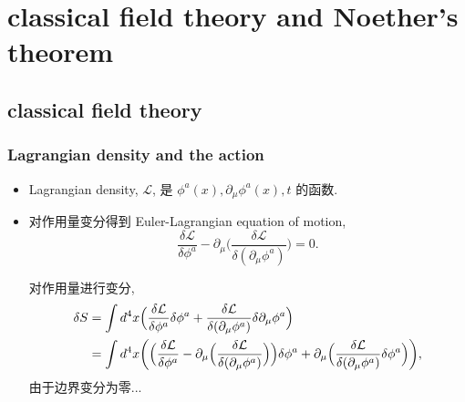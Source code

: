 \chapter{classical field theory and Noether's theorem}
\section{classical field theory}
\subsection{Lagrangian density and the action}
\begin{itemize}
	\item Lagrangian density, $\mathcal{L}$, 是 $\phi^a(x), \partial_\mu \phi^a(x), t$ 的函数.
	
	\item 对作用量变分得到 Euler-Lagrangian equation of motion,
	\begin{equation} \label{classical field theory and Noether's theorem.1.1}
		\frac{\delta \mathcal{L}}{\delta \phi^a} - \partial_\mu \Big( \frac{\delta \mathcal{L}}{\delta (\partial_\mu \phi^a)} \Big) = 0.
	\end{equation}
	
	\begin{tcolorbox}[title=calculation:]
		对作用量进行变分,
		\begin{align}
			\delta S &= \int d^4 x \Big( \frac{\delta \mathcal{L}}{\delta \phi^a} \delta \phi^a + \frac{\delta \mathcal{L}}{\delta (\partial_\mu \phi^a)} \delta \partial_\mu \phi^a \Big) \notag \\
			&= \int d^4 x \bigg( \Big( \frac{\delta \mathcal{L}}{\delta \phi^a} - \partial_\mu \Big( \frac{\delta \mathcal{L}}{\delta (\partial_\mu \phi^a)} \Big) \Big) \delta \phi^a + \partial_\mu \Big( \frac{\delta \mathcal{L}}{\delta (\partial_\mu \phi^a)} \delta \phi^a \Big) \bigg),
		\end{align}
		由于边界变分为零...
	\end{tcolorbox}
\end{itemize}

